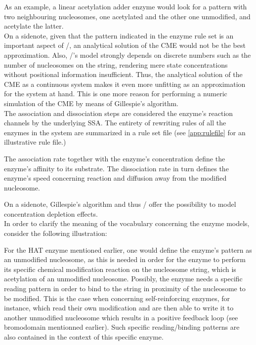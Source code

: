             As an example, a linear acetylation adder enzyme would look for a pattern with two neighbouring nucleosomes, one acetylated and the other one unmodified, and acetylate the latter.\\

            On a sidenote, given that the pattern indicated in the enzyme rule set is an important aspect of \ed/, an analytical solution of the CME would not be the best approximation. Also, \ed/'s model strongly depends on discrete numbers such as the number of nucleosomes on the string, rendering mere state concentrations without positional information insufficient. Thus, the analytical solution of the CME as a continuous system makes it even more unfitting as an approximation for the system at hand. This is one more reason for performing a numeric simulation of the CME by means of Gillespie's algorithm.\\

            The association and dissociation steps are considered the enzyme's reaction channels by the underlying SSA. The entirety of rewriting rules of all the enzymes in the system are summarized in a rule set file (see \ref{app:rulefile} for an illustrative rule file.)

            The association rate together with the enzyme's concentration define the enzyme's affinity to its substrate. The dissociation rate in turn defines the enzyme's speed concerning reaction and diffusion away from the modified nucleosome.

            On a sidenote, Gillespie's algorithm and thus \ed/ offer the possibility to model concentration depletion effects.\\


            In order to clarify the meaning of the vocabulary concerning the enzyme models, consider the following illustration:

            For the HAT enzyme mentioned earlier, one would define the enzyme’s pattern as an unmodified nucleosome, as this is needed in order for the enzyme to perform its specific chemical modification reaction on the nucleosome string, which is acetylation of an unmodified nucleosome. Possibly, the enzyme needs a specific reading pattern in order to bind to the string in proximity of the nucleosome to be modified. This is the case when concerning self-reinforcing enzymes, for instance, which read their own modification and are then able to write it to another unmodified nucleosome which results in a positive feedback loop (see bromodomain mentionned earlier). Such specific reading/binding patterns are also contained in the context of this specific enzyme.

